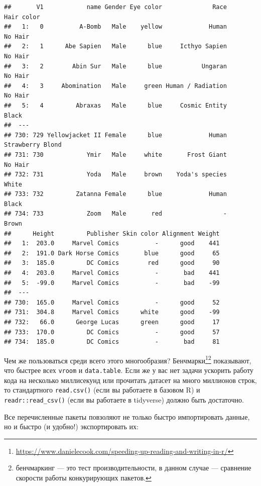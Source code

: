 \documentclass[
]{book}
\renewcommand{\href}[2]{#2\footnote{\url{#1}}}
\begin{document}
\begin{verbatim}
##       V1            name Gender Eye color              Race       Hair color
##   1:   0          A-Bomb   Male    yellow             Human          No Hair
##   2:   1      Abe Sapien   Male      blue     Icthyo Sapien          No Hair
##   3:   2        Abin Sur   Male      blue           Ungaran          No Hair
##   4:   3     Abomination   Male     green Human / Radiation          No Hair
##   5:   4         Abraxas   Male      blue     Cosmic Entity            Black
##  ---                                                                        
## 730: 729 Yellowjacket II Female      blue             Human Strawberry Blond
## 731: 730            Ymir   Male     white       Frost Giant          No Hair
## 732: 731            Yoda   Male     brown    Yoda's species            White
## 733: 732         Zatanna Female      blue             Human            Black
## 734: 733            Zoom   Male       red                 -            Brown
##      Height         Publisher Skin color Alignment Weight
##   1:  203.0     Marvel Comics          -      good    441
##   2:  191.0 Dark Horse Comics       blue      good     65
##   3:  185.0         DC Comics        red      good     90
##   4:  203.0     Marvel Comics          -       bad    441
##   5:  -99.0     Marvel Comics          -       bad    -99
##  ---                                                     
## 730:  165.0     Marvel Comics          -      good     52
## 731:  304.8     Marvel Comics      white      good    -99
## 732:   66.0      George Lucas      green      good     17
## 733:  170.0         DC Comics          -      good     57
## 734:  185.0         DC Comics          -       bad     81
\end{verbatim}

Чем же пользоваться среди всего этого многообразия? \href{https://www.danielecook.com/speeding-up-reading-and-writing-in-r/}{Бенчмарки}\footnote{бенчмаркинг --- это тест производительности, в данном случае --- сравнение скорости работы конкурирующих пакетов.} показывают, что быстрее всех \texttt{vroom} и \texttt{data.table}. Если же у вас нет задачи ускорить работу кода на несколько миллисекунд или прочитать датасет на много миллионов строк, то стандартного \texttt{read.csv()} (если вы работаете в базовом R) и \texttt{readr::read\_csv()} (если вы работаете в tidyverse) должно быть достаточно.

Все перечисленные пакеты повзоляют не только быстро импортировать данные, но и быстро (и удобно!) экспортировать их:
\end{document}
